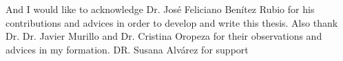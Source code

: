 
\begin{acknowledgements}      

And I would like to acknowledge Dr. Jos\'e Feliciano Ben\'itez Rubio for his contributions and advices in order to develop  and write this thesis. Also thank Dr. Dr. Javier Murillo and  Dr. Cristina Oropeza for their observations and advices in my formation. 
DR. Susana Alv\'arez for support 

\end{acknowledgements}
